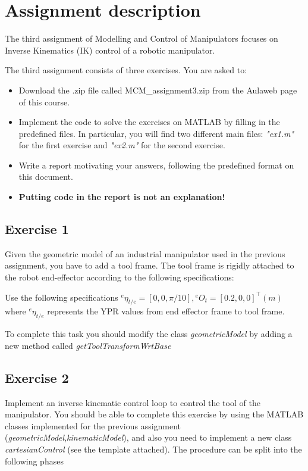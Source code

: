 \section{Assignment description}
The third assignment of Modelling and Control of Manipulators focuses on Inverse Kinematics (IK) control of a robotic manipulator.

The third assignment consists of three exercises. You are asked to:
\begin{itemize}
    \item Download the .zip file called MCM\_assignment3.zip from the Aulaweb page of this course.
    \item Implement the code to solve the exercises on MATLAB by filling in the predefined files. In particular, you will find two different main files: \textit{"ex1.m"} for the first exercise and \textit{"ex2.m"} for the second exercise.
    \item Write a report motivating your answers, following the predefined format on this document.
    \item \textbf{Putting code in the report is not an explanation!}
\end{itemize}

\subsection{Exercise 1}

Given the geometric model of an industrial manipulator used in the previous assignment, you have to add a tool frame.
The tool frame is rigidly attached to the robot end-effector according to the following specifications:  

Use the following specifications
$ {}^e \eta_{t/e}=[0,0,\pi/10], {}^eO_t=[0.2,0,0]^{\top}(m)$ 
where ${}^e\eta_{t/e}$ represents the YPR values from end effector frame to tool frame.

To complete this task you should modify the class \textit{geometricModel} by adding a new method called \textit{getToolTransformWrtBase}

\subsection{Exercise 2}

Implement an inverse kinematic control loop to control the tool of the manipulator. You should be able to complete this exercise by using the MATLAB classes implemented for the previous assignment (\textit{geometricModel},\textit{kinematicModel}), and also you need to implement a new class \textit{cartesianControl} (see the template attached). The procedure can be split into the following phases

